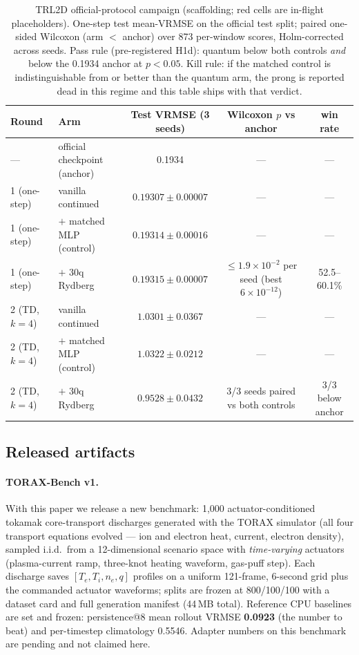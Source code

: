 \documentclass{article}
\newcommand{\TRLanchorRepro}{0.1934}  %
\newcommand{\TRLwindows}{873}         %
\newcommand{\TRLvanilla}{$0.19307 \pm 0.00007$}   %
\newcommand{\TRLquantum}{$0.19315 \pm 0.00007$}   %
\newcommand{\TRLmlp}{$0.19314 \pm 0.00016$}       %
\newcommand{\TRLpvalue}{$\le 1.9{\times}10^{-2}$ per seed (best $6{\times}10^{-12}$)}      %
\newcommand{\TRLwinrate}{52.5--60.1\%}   %
\newcommand{\TDvanilla}{$1.0301 \pm 0.0367$}
\newcommand{\TDquantum}{$\mathbf{0.9528 \pm 0.0432}$}
\newcommand{\TDmlp}{$1.0322 \pm 0.0212$}
\newcommand{\TDpvalue}{3/3 seeds paired vs both controls}
\newcommand{\TDwinrate}{3/3 below anchor}
\begin{document}
\begin{table}[h]
\centering
\small
\setlength{\tabcolsep}{5pt}
\begin{tabular}{llccc}
\toprule
Round & Arm & Test VRMSE (3 seeds) & Wilcoxon $p$ vs anchor & win rate \\
\midrule
--- & official checkpoint (anchor) & \TRLanchorRepro & --- & --- \\
\midrule
1 (one-step) & vanilla continued & \TRLvanilla & --- & --- \\
1 (one-step) & $+$ matched MLP (control) & \TRLmlp & --- & --- \\
1 (one-step) & $+$ 30q Rydberg & \TRLquantum & \TRLpvalue & \TRLwinrate \\
\midrule
2 (TD, $k{=}4$) & vanilla continued & \TDvanilla & --- & --- \\
2 (TD, $k{=}4$) & $+$ matched MLP (control) & \TDmlp & --- & --- \\
2 (TD, $k{=}4$) & $+$ 30q Rydberg & \TDquantum & \TDpvalue & \TDwinrate \\
\bottomrule
\end{tabular}
\vspace{2pt}
\caption{TRL2D official-protocol campaign (scaffolding; red cells are
in-flight placeholders). One-step test mean-VRMSE on the official test
split; paired one-sided Wilcoxon (arm $<$ anchor) over \TRLwindows{}
per-window scores, Holm-corrected across seeds. Pass rule (pre-registered
H1d): quantum below both controls \emph{and} below the \TRLanchorRepro{}
anchor at $p<0.05$. Kill rule: if the matched control is indistinguishable
from or better than the quantum arm, the prong is reported dead in this
regime and this table ships with that verdict.}
\label{tab:campaign}
\end{table}

\subsection{Released artifacts}
\label{sec:artifacts}

\paragraph{TORAX-Bench v1.} With this paper we release a new benchmark:
1{,}000 actuator-conditioned tokamak core-transport discharges generated
with the TORAX simulator (all four transport equations evolved --- ion and
electron heat, current, electron density), sampled i.i.d.\ from a
12-dimensional scenario space with \emph{time-varying} actuators
(plasma-current ramp, three-knot heating waveform, gas-puff step). Each
discharge saves $[T_e, T_i, n_e, q]$ profiles on a uniform 121-frame,
6-second grid plus the commanded actuator waveforms; splits are frozen at
800/100/100 with a dataset card and full generation manifest (44\,MB
total). Reference CPU baselines are set and frozen: persistence@8 mean
rollout VRMSE \textbf{0.0923} (the number to beat) and per-timestep
climatology 0.5546. Adapter numbers on this benchmark are pending and not
claimed here.
\end{document}
